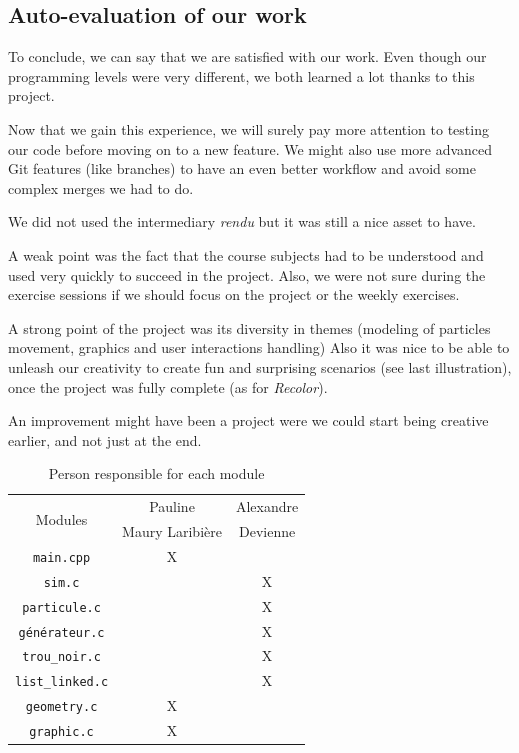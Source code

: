 \documentclass[a4paper]{article} %
\begin{document}
\begin{multicols*}{2}
\subsection{Auto-evaluation of our work}
To conclude, we can say that we are satisfied with our work.
Even though our programming levels were very different,
we both learned a lot thanks to this project.

Now that we gain this experience, we will surely pay more attention to testing our code
before moving on to a new feature.
We might also use more advanced Git features (like branches) to have an even better workflow and
avoid some complex merges we had to do.

We did not used the intermediary \emph{rendu} but it was still a nice asset to have.

A weak point was the fact that the course subjects had to be understood
and used very quickly to succeed in the project.
Also, we were not sure during the exercise sessions if we should focus
on the project or the weekly exercises.

A strong point of the project was its diversity in themes (modeling of particles movement, graphics and user interactions handling)
Also it was nice to be able to unleash our creativity to create fun and surprising scenarios (see last illustration),
once the project was fully complete (as for \emph{Recolor}).

An improvement might have been a project were we could start being creative earlier, and not just at the end.

\begin{table}[H]
\begin{center}
\begin{tabular}{|c|c|c|}
\hline
\multicolumn{1}{|c|}{\multirow{2}{*}{Modules}} & Pauline & Alexandre \\
 & Maury Laribière &  Devienne\\
\hline
\hline
\texttt{main.cpp} &  X &\\
\hline
\texttt{sim.c} & &X\\
\hline
\texttt{particule.c} & & X\\
\hline
\texttt{générateur.c} & & X\\
\hline
\texttt{trou\_noir.c} & & X\\
\hline
\texttt{list\_linked.c} & &X\\
\hline
\texttt{geometry.c} & X&\\
\hline
\texttt{graphic.c} & X&\\
\hline
\end{tabular}
\end{center}
\caption{Person responsible for each module}
\label{tab-module}
\end{table}


\end{multicols*}
\end{document}
